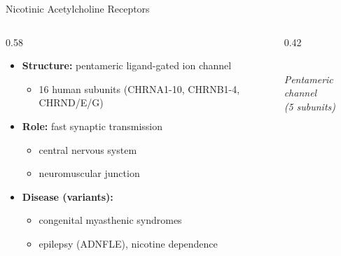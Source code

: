 \documentclass[aspectratio=169]{beamer}
\begin{document}
\begin{frame}{Nicotinic Acetylcholine Receptors}
\begin{columns}[T]
\begin{column}{0.58\textwidth}
\small
\begin{itemize}\setlength\itemsep{0.5em}
  \item \textbf{Structure:} pentameric ligand-gated ion channel
        \begin{itemize}
          \item 16 human subunits (CHRNA1-10, CHRNB1-4, CHRND/E/G)
        \end{itemize}
  \item \textbf{Role:} fast synaptic transmission
        \begin{itemize}
          \item central nervous system
          \item neuromuscular junction
        \end{itemize}
  \item \textbf{Disease (variants):}
        \begin{itemize}
          \item congenital myasthenic syndromes
          \item epilepsy (ADNFLE), nicotine dependence
          
        \end{itemize}
\end{itemize}
\end{column}
\begin{column}{0.42\textwidth}
\centering
{}\\[0.2cm]
{\footnotesize\itshape Pentameric channel\\(5 subunits)}
\end{column}
\end{columns}
\end{frame}
\end{document}
